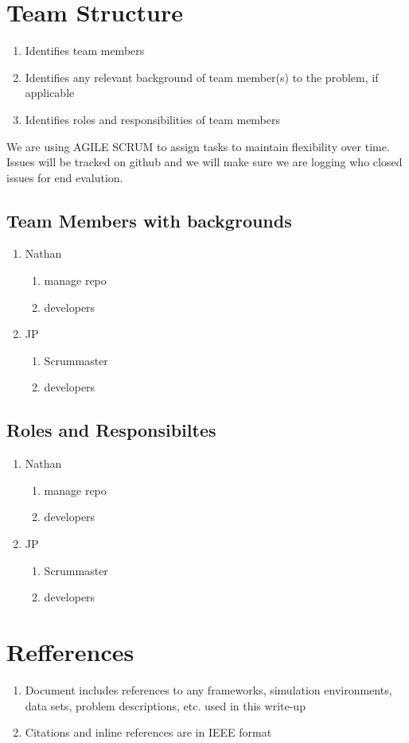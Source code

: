 \documentclass[11pt]{article}
\begin{document}
\section{Team Structure}
\begin{enumerate}
\item Identifies team members
\item Identifies any relevant background of team member(s) to the problem, if applicable
\item Identifies roles and responsibilities of team members
\end{enumerate}

We are using AGILE SCRUM to assign tasks to maintain flexibility over time. Issues will be tracked on github and
we will make sure we are logging who closed issues for end evalution.
\subsection{Team Members with backgrounds}
\begin{enumerate}
\item Nathan
  \begin{enumerate}
  \item manage repo
  \item developers
  \end{enumerate}
\item JP
  \begin{enumerate}
  \item Scrummaster
  \item developers
  \end{enumerate}
\end{enumerate}
\subsection{Roles and Responsibiltes}
\begin{enumerate}
\item Nathan
  \begin{enumerate}
  \item manage repo
  \item developers
  \end{enumerate}
\item JP
  \begin{enumerate}
  \item Scrummaster
  \item developers
  \end{enumerate}
\end{enumerate}

\section{Refferences}
\begin{enumerate}
\item Document includes references to any frameworks, simulation environments, data sets, problem descriptions,
  etc. used in this write-up
\item Citations and inline references are in IEEE format
\end{enumerate}
\printbibliography
\end{document}
